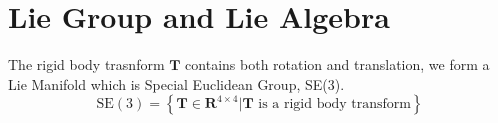 \section{Lie Group and Lie Algebra}
The rigid body trasnform $\mathbf{T}$ contains both rotation and translation, we form a Lie Manifold which is Special Euclidean Group, SE(3).
\begin{equation}
    \mathrm{SE}(3) = 
    \left\{ \mathbf{T} \in \mathbb{\mathbf{R}}^{4 \times 4} \vert \mathbf{T} \text{ is a rigid body transform} \right\} 
\end{equation}